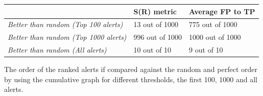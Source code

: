 \begin{table}[H]
	\centering
	\begin{tabular}{@{}lll@{}}
		\toprule
		& \textbf{S(R) metric} & \textbf{Average FP to TP} \\ \midrule
		\textit{Better than random (Top 100 alerts)}  & 13 out of 1000       & 775 out of 1000           \\
		\textit{Better than random (Top 1000 alerts)} & 996 out of 1000      & 1000 out of 1000          \\
		\textit{Better than random (All alerts)}      & 10 out of 10         & 9 out of 10               \\ \bottomrule
	\end{tabular}
\end{table}


The order of the ranked alerts if compared against the random and perfect order by using the cumulative graph for different thresholds, the first 100, 1000 and all alerts.

